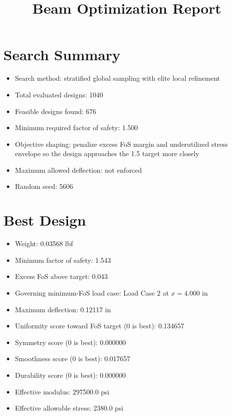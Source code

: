 \documentclass[11pt]{article}
\title{Beam Optimization Report}
\date{}
\begin{document}
\maketitle

\section*{Search Summary}
\begin{itemize}
\item Search method: stratified global sampling with elite local refinement
\item Total evaluated designs: 1040
\item Feasible designs found: 676
\item Minimum required factor of safety: 1.500
\item Objective shaping: penalize excess FoS margin and underutilized stress envelope so the design approaches the 1.5 target more closely
\item Maximum allowed deflection: not enforced
\item Random seed: 5606
\end{itemize}

\section*{Best Design}
\begin{itemize}
\item Weight: 0.03568 lbf
\item Minimum factor of safety: 1.543
\item Excess FoS above target: 0.043
\item Governing minimum-FoS load case: Load Case 2 at $x=4.000$ in
\item Maximum deflection: 0.12117 in
\item Uniformity score toward FoS target (0 is best): 0.134657
\item Symmetry score (0 is best): 0.000000
\item Smoothness score (0 is best): 0.017657
\item Durability score (0 is best): 0.000000
\item Effective modulus: 297500.0 psi
\item Effective allowable stress: 2380.0 psi
\end{itemize}
\end{document}
